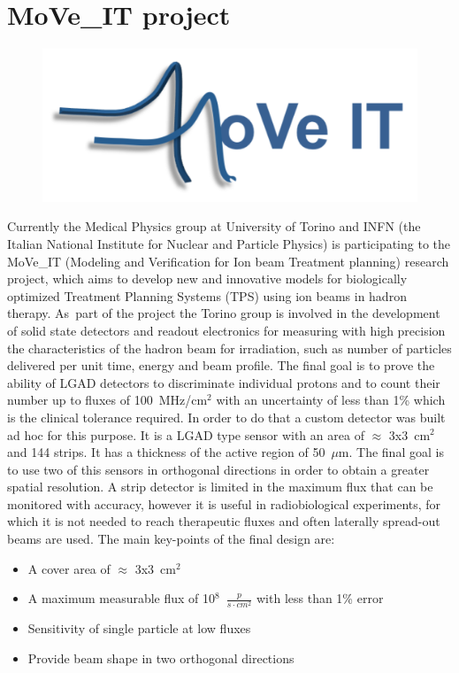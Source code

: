 \section{MoVe\_IT project}
\begin{figure}[H]
	\centering
	\includegraphics[width=0.35\linewidth]{IMG/ch2/Move_IT_logo}
\end{figure}
\noindent Currently the Medical Physics group at University of Torino and INFN (the Italian National Institute for
Nuclear and Particle Physics) is participating to the MoVe\_IT\cite{moveit} (Modeling and Verification for Ion beam Treatment planning)
research project, which aims to develop new and
innovative models for biologically optimized Treatment Planning Systems (TPS) using ion beams in hadron therapy.
As~part of the project the Torino group is involved in the development of solid state detectors and readout electronics for measuring with high precision
the characteristics of the hadron beam for irradiation, such as number of particles delivered per unit time, energy and beam profile.
The final goal is to prove the ability of LGAD detectors to discriminate individual protons and to count their number up to fluxes of 100~MHz/cm$^2$ with an uncertainty of less than 1\% which is the clinical tolerance required.
In order to do that a custom detector was built ad hoc for this purpose. It is a LGAD type sensor with an area of $\approx$ 3x3~cm$^2$ and 144 strips. It has a thickness of the active region of 50~$\mu$m.
The final goal is to use two of this sensors in orthogonal directions in order to obtain a greater spatial resolution.
A strip detector is limited in the maximum flux that can be monitored with accuracy, however it is useful in radiobiological experiments, for which it is not needed to reach therapeutic fluxes and often laterally spread-out beams are used\cite{hammad}.
The main key-points of the final design are:
\begin{itemize}
	\item A cover area of $\approx$ 3x3~cm$^2$
	\item A maximum measurable flux of 10$^8$~$\frac{p}{s \cdot cm^2}$ with less than 1\% error
	\item Sensitivity of single particle at low fluxes
	\item Provide beam shape in two orthogonal directions
\end{itemize}


